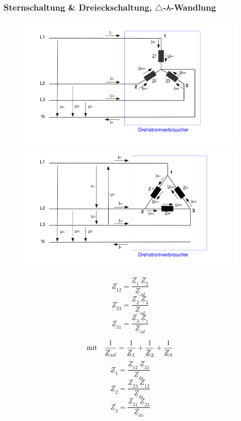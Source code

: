 \documentclass[a4paper, 11pt]{article}
\begin{document}
\begin{spacing}{0.1}
\subsubsection*{Sternschaltung \& Dreieckschaltung, $\triangle$-$\Yup$-Wandlung}
\begin{figure}[H]
	\centering
	\includegraphics[scale=0.26]{img/drehstrom_stern.pdf}
	\includegraphics[scale=0.26]{img/drehstrom_dreieck.pdf}
\end{figure}

\begin{multicols}{2}
\footnotesize
\[
	\underline{Z}_{12} = \frac{\underline{Z}_{1} ~ \underline{Z}_{2}}{\underline{Z}_{sd}}
\]
\[
	\underline{Z}_{23} = \frac{\underline{Z}_{2} ~ \underline{Z}_{3}}{\underline{Z}_{sd}}
\]
\[
	\underline{Z}_{31} = \frac{\underline{Z}_{3} ~ \underline{Z}_{1}}{\underline{Z}_{sd}}
\]

\[
	\textnormal{mit} \quad  \frac{1}{\underline{Z}_{sd}}=\frac{1}{\underline{Z}_1}+\frac{1}{\underline{Z}_2}+\frac{1}{\underline{Z}_3}
\]
\vfill
\columnbreak
\[
	\underline{Z}_1 = \frac{\underline{Z}_{12} ~ \underline{Z}_{31}}{\underline{Z}_{ds}}
\]
\[
	\underline{Z}_2 = \frac{\underline{Z}_{23} ~ \underline{Z}_{12}}{\underline{Z}_{ds}}
\]
\[
	\underline{Z}_3 = \frac{\underline{Z}_{31} ~ \underline{Z}_{23}}{\underline{Z}_{ds}}
\]


\end{multicols}
\end{spacing}
\end{document}
